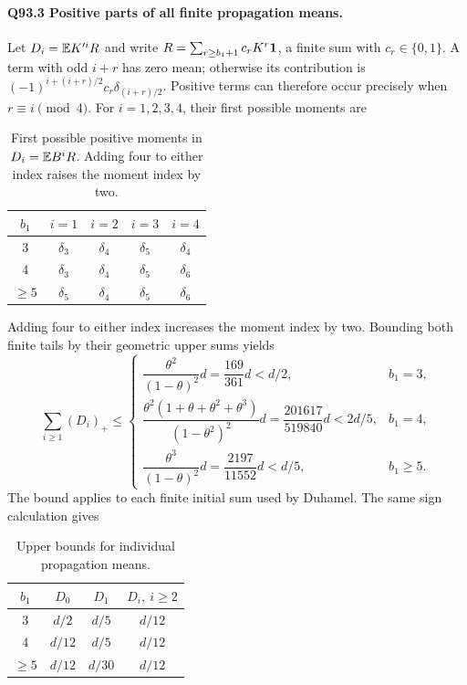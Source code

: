 \paragraph{Q93.3 Positive parts of all finite propagation means.}
Let \(D_i=\mathbb E K'^iR\) and write
\(R=\sum_{r\ge b_1+1}c_rK^r\mathbf1\), a finite sum with \(c_r\in\{0,1\}\).
A term with odd \(i+r\) has zero mean; otherwise its contribution is
\((-1)^{i+(i+r)/2}c_r\delta_{(i+r)/2}\).
Positive terms can therefore occur precisely when \(r\equiv i\pmod4\).
For \(i=1,2,3,4\), their first possible moments are
\begin{table}[htbp]
\centering\small
\setlength{\tabcolsep}{5pt}
\caption{First possible positive moments in $D_i=\mathbb E B^iR$. Adding four to either index raises the moment index by two.}\label{tab:oc:q93-positive-starts}
\begin{tabular}{ccccc}
\toprule
$b_1$ & $i=1$ & $i=2$ & $i=3$ & $i=4$\\
\midrule
$3$ & $\delta_3$ & $\delta_4$ & $\delta_5$ & $\delta_4$\\
$4$ & $\delta_3$ & $\delta_4$ & $\delta_5$ & $\delta_6$\\
$\ge5$ & $\delta_5$ & $\delta_4$ & $\delta_5$ & $\delta_6$\\
\bottomrule
\end{tabular}
\end{table}
Adding four to either index increases the moment index by two.
Bounding both finite tails by their geometric upper sums yields
\begin{equation}\tag{Q93.3.1}\label{eq:Q93:3.1}
\sum_{i\ge1}(D_i)_+\le
\begin{cases}
\dfrac{\theta^2}{(1-\theta)^2}d=\dfrac{169}{361}d<d/2,&b_1=3,\\[1mm]
\dfrac{\theta^2(1+\theta+\theta^2+\theta^3)}{(1-\theta^2)^2}d
=\dfrac{201617}{519840}d<2d/5,&b_1=4,\\[1mm]
\dfrac{\theta^3}{(1-\theta)^2}d=\dfrac{2197}{11552}d<d/5,&b_1\ge5.
\end{cases}
\end{equation}
The bound applies to each finite initial sum used by Duhamel.
The same sign calculation gives
\begin{table}[htbp]
\centering\small
\setlength{\tabcolsep}{5pt}
\caption{Upper bounds for individual propagation means.}\label{tab:oc:q93-individual-means}
\begin{tabular}{cccc}
\toprule
$b_1$ & $D_0$ & $D_1$ & $D_i,\ i\ge2$\\
\midrule
$3$ & $d/2$ & $d/5$ & $d/12$\\
$4$ & $d/12$ & $d/5$ & $d/12$\\
$\ge5$ & $d/12$ & $d/30$ & $d/12$\\
\bottomrule
\end{tabular}
\end{table}

